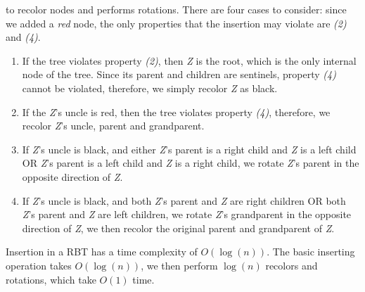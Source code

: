 \documentclass[14pt]{article}
\begin{document}
to recolor nodes and performs rotations. \newline
There are four cases to consider: since we added a \textit{red} node, the only properties that the insertion may violate
are \textit{(2)} and \textit{(4)}.
\begin{enumerate}
    \item If the tree violates property \textit{(2)}, then \textit{Z} is the root, which is the only internal
    node of the tree.
    Since its parent and children are sentinels, property \textit{(4)} cannot be violated, therefore, we simply recolor
    \textit{Z} as black.
    \item If the \textit{Z}'s uncle is red, then the tree violates property \textit{(4)}, therefore, we recolor
    \textit{Z}'s uncle, parent and grandparent.
    \item If \textit{Z}'s uncle is black, and either \textit{Z}'s parent is a right child and \textit{Z} is a left child
    OR \textit{Z}'s parent is a left child and \textit{Z} is a right child, we rotate \textit{Z}'s parent in
    the opposite direction of \textit{Z}.
    \item If \textit{Z}'s uncle is black, and both \textit{Z}'s parent and \textit{Z} are right children OR
    both \textit{Z}'s parent and \textit{Z} are left children, we rotate \textit{Z}'s grandparent in the opposite
    direction of \textit{Z}, we then recolor the original parent and grandparent of \textit{Z}.
\end{enumerate}
    Insertion in a RBT has a time complexity of $O(\log(n))$. \newline
    The basic inserting operation takes $O(\log(n))$, we then perform $\log(n)$ recolors and rotations,
    which take $O(1)$ time. \newline
\end{document}
